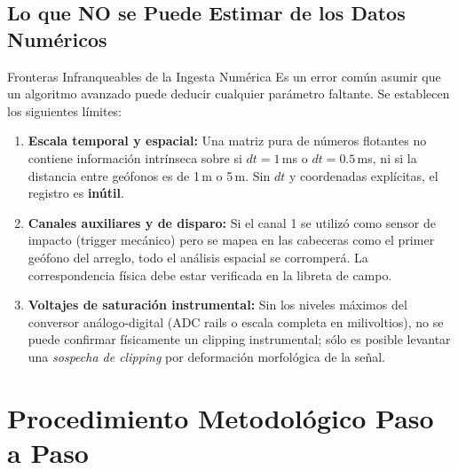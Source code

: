 \documentclass[11pt,a4paper]{article}
\begin{document}
\subsection{Lo que NO se Puede Estimar de los Datos Numéricos}
\begin{limitbox}{Fronteras Infranqueables de la Ingesta Numérica}
Es un error común asumir que un algoritmo avanzado puede deducir cualquier parámetro faltante. Se establecen los siguientes límites:
\begin{enumerate}
    \item \textbf{Escala temporal y espacial:} Una matriz pura de números flotantes no contiene información intrínseca sobre si $dt = 1$\,ms o $dt = 0.5$\,ms, ni si la distancia entre geófonos es de 1\,m o 5\,m. Sin $dt$ y coordenadas explícitas, el registro es \textbf{inútil}.
    \item \textbf{Canales auxiliares y de disparo:} Si el canal 1 se utilizó como sensor de impacto (trigger mecánico) pero se mapea en las cabeceras como el primer geófono del arreglo, todo el análisis espacial se corromperá. La correspondencia física debe estar verificada en la libreta de campo.
    \item \textbf{Voltajes de saturación instrumental:} Sin los niveles máximos del conversor análogo-digital (ADC rails o escala completa en milivoltios), no se puede confirmar físicamente un clipping instrumental; sólo es posible levantar una \emph{sospecha de clipping} por deformación morfológica de la señal.
\end{enumerate}
\end{limitbox}

\newpage
\section{Procedimiento Metodológico Paso a Paso}
\end{document}
